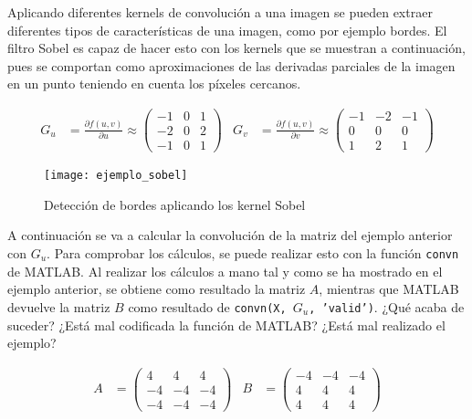		Aplicando diferentes kernels de convolución a una imagen se pueden extraer diferentes tipos de características de una imagen, como por ejemplo bordes. El filtro Sobel es capaz de hacer esto con los kernels que se muestran a continuación, pues se comportan como aproximaciones de las derivadas parciales de la imagen en un punto teniendo en cuenta los píxeles cercanos\cite{Gao2010}. 
		
		\begin{align*}
			G_u &= \frac{\partial f(u, v)}{\partial u} \approx \begin{pmatrix}
				-1 & 0 & 1\\
				-2 & 0 & 2\\
				-1 & 0 & 1
			\end{pmatrix}&
			G_v &= \frac{\partial f(u, v)}{\partial v} \approx \begin{pmatrix}
				-1 & -2 & -1\\
				0 & 0 & 0\\
				1 & 2 & 1
			\end{pmatrix}
		\end{align*}
		
		\begin{figure}[!h]
			\centering
			\texttt{[image: ejemplo\_sobel]}
			\caption{Detección de bordes aplicando los kernel Sobel}
			\label{fig:sobel}
		\end{figure}
		
		A continuación se va a calcular la convolución de la matriz del ejemplo anterior con $G_u$. Para comprobar los cálculos, se puede realizar esto con la función \texttt{convn} de MATLAB. Al realizar los cálculos a mano tal y como se ha mostrado en el ejemplo anterior, se obtiene como resultado la matriz $A$, mientras que MATLAB devuelve la matriz $B$ como resultado de \texttt{convn(X, $G_u$, 'valid')}. ¿Qué acaba de suceder? ¿Está mal codificada la función de MATLAB? ¿Está mal realizado el ejemplo?
		
		\begin{align*} A &= 
			\begin{pmatrix}
				4 & 4 & 4\\
				-4 & -4 & -4\\
				-4 & -4 & -4
			\end{pmatrix}&
			B &= \begin{pmatrix}
				-4 & -4 & -4\\
				4 & 4 & 4\\
				4 & 4 & 4
				\end{pmatrix}
		\end{align*}
		
